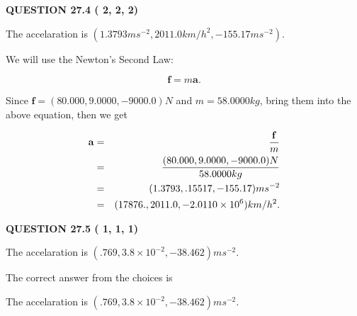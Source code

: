 \documentclass[12pt]{article}
\begin{document}
\vspace{0.2in}
  
{\textbf{\Large{QUESTION
27.4 
 (          2,          2,          2)
}}}
  
  
 
 
\noindent{}
 
 
The accelaration is
$(
1.3793ms^{-2},
2011.0km/h^2,
-155.17ms^{-2}
).
$
 
 
 
 
 
 
\noindent{}

We will use the Newton's Second Law:
 
\[
\mathbf{f}=m\mathbf{a}.
\]
 
Since $\mathbf{f}=( %
80.000,  %
9.0000,  %
-9000.0 )N$
and $m= %
58.0000kg$, bring them into the above equation, then we get
 
\begin{eqnarray*}
\mathbf{a}&=&\frac{\mathbf{f}}m  \\
&=&\frac{(
80.000 ,
9.0000 ,
-9000.0 )N
}{ %
58.0000 kg}  \\
&=&(
1.3793 ,
.15517,
-155.17
)ms^{-2} \\
&=&(
17876. ,
2011.0 ,
-2.0110 \times 10^{6}
)km/h^2.
\end{eqnarray*}
 
 
 
  
\vspace{0.2in}
  
{\textbf{\Large{QUESTION
27.5 
 (          1,          1,          1)
}}}
  
  


 
 
\noindent{}
 
 
The accelaration is $  %
(
.769,
3.8 \times 10^{-2},
-38.462)
ms^{-2} $.
 
 
 
 
 
 
\noindent{}

The correct answer from the choices is


The accelaration is $  %
(
.769,
3.8 \times 10^{-2},
-38.462)
ms^{-2} $.
 
\end{document}
